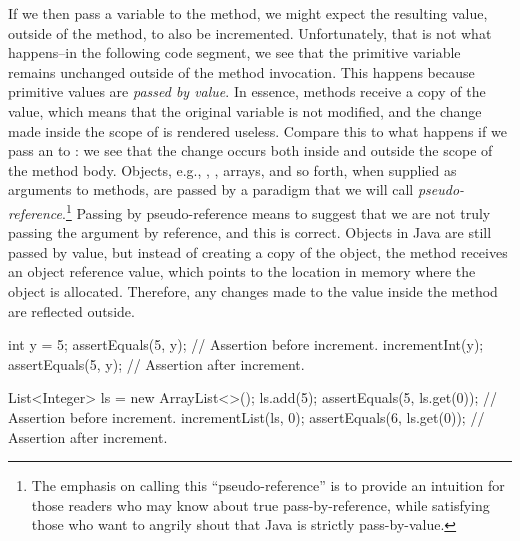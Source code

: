 If we then pass a variable to the  method, we might expect the resulting value, outside of the method, to also be incremented. Unfortunately, that is not what happens--in the following code segment, we see that the primitive variable  remains unchanged outside of the method invocation. This happens because primitive values are \emph{passed by value}. In essence, methods receive a copy of the value, which means that the original variable is not modified, and the change made inside the scope of  is rendered useless. Compare this to what happens if we pass an  to : we see that the change occurs both inside and outside the scope of the method body. Objects, e.g., , , arrays, and so forth, when supplied as arguments to methods, are passed by a paradigm that we will call \emph{pseudo-reference}.\footnote{The emphasis on calling this ``pseudo-reference'' is to provide an intuition for those readers who may know about true pass-by-reference, while satisfying those who want to angrily shout that Java is strictly pass-by-value.} Passing by pseudo-reference means to suggest that we are not truly passing the argument by reference, and this is correct. Objects in Java are still passed by value, but instead of creating a copy of the object, the method receives an object reference value, which points to the location in memory where the object is allocated. Therefore, any changes made to the value inside the method are reflected outside.

\begin{verbnobox}[\small]
int y = 5;
assertEquals(5, y);         // Assertion before increment.
incrementInt(y);
assertEquals(5, y);         // Assertion after increment.
\end{verbnobox}

\begin{verbnobox}[\small]
List<Integer> ls = new ArrayList<>();
ls.add(5);
assertEquals(5, ls.get(0)); // Assertion before increment.
incrementList(ls, 0);
assertEquals(6, ls.get(0)); // Assertion after increment.
\end{verbnobox}


